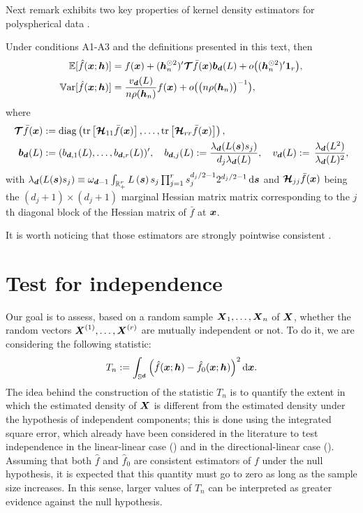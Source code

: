 \documentclass[oneside,11pt]{article}
\begin{document}
Next remark exhibits two key properties of kernel density estimators for polyspherical data \citep{Garcia-Portugues2024}.
\begin{remark}
    \citep{Garcia-Portugues2024}
    Under conditions A1-A3 and the definitions presented in this text, then
    \begin{align}
 \mathbb{E}[\hat{f}(\boldsymbol{x};{\boldsymbol{h}})]&=f(\boldsymbol{x})+({\boldsymbol{h}}_n^{\odot 2})'\boldsymbol{\mathcal{T}}\bar{f}(\boldsymbol{x})\boldsymbol{b}_{\boldsymbol{d}}(L)+o\big(({\boldsymbol{h}}_n^{\odot 2})'\mathbf{1}_r\big),\label{eq:estimator:bias}\\
	\mathbb{V}\mathrm{ar}[\hat{f}(\boldsymbol{x};{\boldsymbol{h}})]&=\frac{v_{\boldsymbol{d}}(L)}{n\rho({\boldsymbol{h}}_n)}f(\boldsymbol{x}) +o\big(\big(n \rho({\boldsymbol{h}}_n)\big)^{-1}\big),\label{eq:estimator:variance}
\end{align}
where
\begin{align}
        \boldsymbol{\mathcal{T}}\bar{f}(\boldsymbol{x}):=&\;\mathrm{diag}\left( \mathrm{tr}\left[\boldsymbol{\mathcal{H}}_{11}\bar{f}(\boldsymbol{x})\right],\ldots,\mathrm{tr}\left[\boldsymbol{\mathcal{H}}_{rr}\bar{f}(\boldsymbol{x})\right]\right),\nonumber\\
        \boldsymbol{b}_{\boldsymbol{d}}(L):=&\; (b_{\boldsymbol{d},1}(L),\ldots,b_{\boldsymbol{d},r}(L))',\quad b_{\boldsymbol{d},j}(L):=\frac{\lambda_{\boldsymbol{d}}(L(\boldsymbol{s})s_j)}{d_j \lambda_{\boldsymbol{d}}(L)}, \quad v_{\boldsymbol{d}}(L):=\, \frac{\lambda_{\boldsymbol{d}}(L^2)}{\lambda_{\boldsymbol{d}}(L)^2},\label{eq:moments}
\end{align}
with
$\lambda_{\boldsymbol{d}}(L(\boldsymbol{s})s_j)\equiv\omega_{\boldsymbol{d}-1}\int_{\mathbb{R}_+^r}L\left(\boldsymbol{s}\right) s_j \prod_{j=1}^r s_j^{d_j/2-1} 2^{d_j/2-1}\,\mathrm{d} \boldsymbol{s}$ and  $\boldsymbol{\mathcal{H}}_{jj}\bar{f}(\boldsymbol{x})$ being the $(d_j+1)\times(d_j+1)$ marginal Hessian matrix matrix corresponding to the $j$th diagonal block of the Hessian matrix of $\bar{f}$ at $\boldsymbol{x}$.
\end{remark}

It is worth noticing that those estimators are strongly pointwise consistent \citep{Garcia-Portugues2024}.

\section{Test for independence}
\label{sec:indep}

%

Our goal is to assess, based on a random sample $\boldsymbol{X}_1, \dots, \boldsymbol{X}_n$ of $\boldsymbol{X}$, whether the random vectors $\boldsymbol{X}^{(1)}, \dots, \boldsymbol{X}^{(r)}$ are mutually independent or not. To do it, we are considering the following statistic:
\begin{align}\label{eq-tn}
    T_n := \int_{\mathbb{S}^{\boldsymbol{d}}} \Big( \hat{f}(\boldsymbol{x};{\boldsymbol{h}}) - \hat{f}_{0}(\boldsymbol{x};{\boldsymbol{h}}) \Big)^2 \,\mathrm{d} \boldsymbol{x}.
\end{align}
The idea behind the construction of the statistic $T_n$ is to quantify the extent in which the estimated density of $\boldsymbol{X}$ is different from the estimated density under the hypothesis of independent components; this is done using the integrated square error, which already have been considered in the literature to test independence in the linear-linear case (\cite{rosenblatt1992nonparametric}) and in the directional-linear case (\cite{Garcia-Portugues2015}). Assuming that both $ \hat{f}$ and $\hat{f}_{0}$ are consistent estimators of $f$ under the null hypothesis, it is expected that this quantity must go to zero as long as the sample size increases. In this sense, larger values of $T_n$ can be interpreted as greater evidence against the null hypothesis.
\end{document}
